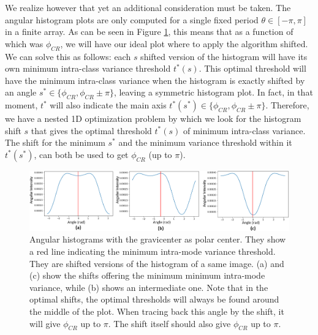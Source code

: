 \documentclass[11pt, a4paper, twoside]{article} %
\begin{document}
We realize however that yet an additional consideration must be taken. The angular histogram plots are only computed for a single fixed period $\theta\in[-\pi,\pi]$ in a finite array. As can be seen in Figure \ref{fig:histo}, this means that as a function of which was $\phi_{CR}$, we will have our ideal plot where to apply the algorithm shifted. We can solve this as follows: each $s$ shifted version of the histogram will have its own minimum intra-class variance threshold $t^*(s)$. This optimal threshold will have the minimum intra-class variance when the histogram is exactly shifted by an angle $s^*\in\{\phi_{CR},\phi_{CR}\pm\pi\}$, leaving a symmetric histogram plot. In fact, in that moment, $t^*$ will also indicate the main axis $t^*(s^*)\in\{\phi_{CR},\phi_{CR}\pm\pi\}$. Therefore, we have a nested 1D optimization problem by which we look for the histogram shift $s$ that gives the optimal threshold $t^*(s)$ of minimum intra-class variance. The shift for the minimum $s^*$ and the minimum variance threshold within it $t^*(s^*)$, can both be used to get $\phi_{CR}$ (up to $\pi$).
\begin{figure}[h!] 
     \centering 
    \includegraphics[width=0.99\linewidth]{bimod.PNG}
    \caption{ Angular histograms with the gravicenter as polar center. They show a red line indicating the minimum intra-mode variance threshold. They are shifted versions of the histogram of a same image. (a) and (c) show the shifts offering the minimum minimum intra-mode variance, while (b) shows an intermediate one. Note that in the optimal shifts, the optimal thresholds will always be found around the middle of the plot. When tracing back this angle by the shift, it will give $\phi_{CR}$ up to $\pi$. The shift itself should also give $\phi_{CR}$ up to $\pi$.}
    \label{fig:histo}\vspace{-0.35cm}
\end{figure}
\end{document}
